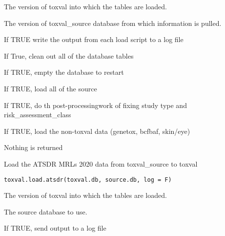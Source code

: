 \documentclass[letterpaper]{book}
\begin{document}
\begin{Arguments}
\begin{ldescription}
\item[\code{toxval.db}] The version of toxval into which the tables are loaded.

\item[\code{source.db}] The version of toxval\_source database from which information is pulled.

\item[\code{log}] If TRUE write the output from each load script to a log file

\item[\code{do.init}] If True, clean out all of the database tables

\item[\code{do.reset}] If TRUE, empty the database to restart

\item[\code{do.load}] If TRUE, load all of the source

\item[\code{do.post}] If TRUE, do th post-processingwork of fixing study type and risk\_assessment\_class

\item[\code{do.extra}] If TRUE, load the non-toxval data (genetox, bcfbaf, skin/eye)
\end{ldescription}
\end{Arguments}
%
\begin{Value}
Nothing is returned
\end{Value}
%
\begin{Description}\relax
Load the ATSDR MRLs 2020 data from toxval\_source to toxval
\end{Description}
%
\begin{Usage}
\begin{verbatim}
toxval.load.atsdr(toxval.db, source.db, log = F)
\end{verbatim}
\end{Usage}
%
\begin{Arguments}
\begin{ldescription}
\item[\code{toxval.db}] The version of toxval into which the tables are loaded.

\item[\code{source.db}] The source database to use.

\item[\code{log}] If TRUE, send output to a log file
\end{ldescription}
\end{Arguments}
\end{document}
